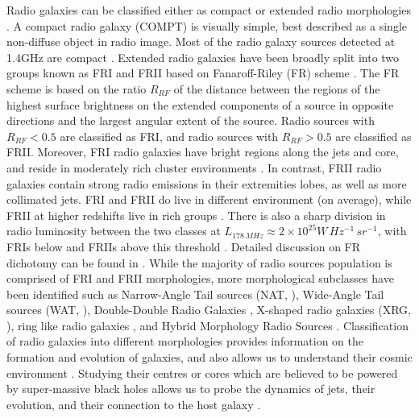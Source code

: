\documentclass[fleqn,usenatbib]{mnras}
\begin{document}
Radio galaxies can be classified either as compact or extended radio morphologies \citep{Miraghaei2017}. A compact radio galaxy (COMPT) is visually simple, best described as a single non-diffuse object in radio image. Most of the radio galaxy sources detected at 1.4GHz are compact \citep{banfield2015radio}. Extended radio galaxies have been broadly split into two groups known as FRI and FRII based on Fanaroff-Riley (FR) scheme \citep{fanaroff1974morphology}. The FR scheme is based on the ratio $R_{RF}$ of  the distance between the regions of the highest   surface brightness on the extended components of a source in opposite directions and the largest angular extent of the source. Radio sources with $R_{RF} < 0.5$ are classified as FRI, and radio sources with $R_{RF}> 0.5$ are classified as FRII. Moreover, FRI  radio galaxies have bright regions along the jets and core, and reside in moderately rich cluster environments \citep{Hill1991}. In contrast,  FRII radio galaxies contain strong radio emissions in their extremities lobes, as well as more collimated jets. FRI and FRII do live in different environment (on average), while FRII at higher redshifts live in rich groups \citep{Zirbel1997}. There is also a sharp division in radio luminosity between the two classes at $ L_{178\, MHz} \approx 2\times  10^{25} W\, Hz^{-1} \, sr^{-1}$,  with FRIs below and FRIIs above this threshold \citep{fanaroff1974morphology, Owen1994}. Detailed discussion  on FR dichotomy can be found in \cite{Saripalli2012}. While the majority of radio sources population is comprised of FRI and FRII morphologies,  more morphological subclasses have been identified such as Narrow-Angle Tail sources (NAT, \citet{Rudnick1976, giacintucci2009tailed}), Wide-Angle Tail sources (WAT, \citet{Owen1976, giacintucci2009tailed}), Double-Double Radio Galaxies \citep[DDRG; ][]{Schoenmakers2001, Saikia2006}, X-shaped radio galaxies (XRG, \citet{Leahy1992, Cheung2007, Yang2019, Bhukta2020}), ring like radio galaxies \citep{Proctor2011}, and  Hybrid Morphology Radio Sources \citep[HYMORS;][]{Gopal-Krishna2000, banfield2015radio, Kapinska2017}. Classification of radio galaxies into different morphologies provides information on the formation and evolution of galaxies, and also allows us to understand their cosmic environment  \citep{helfand2015last}. Studying their centres or cores which are believed to be powered by  super-massive black holes allows  us to probe the dynamics of jets, their evolution, and their connection to the host galaxy \citep{Makhathini2015}.
\end{document}
